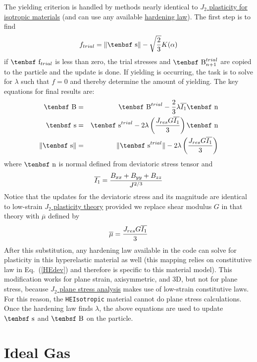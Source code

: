 \documentclass[11pt]{book}
\def\B{\hbox{\tenbsf B}}
\def\dev{\hbox{\tenbsf s}}
\def\ndev{\hbox{\tenbsf n}}
\def\f{\hbox{\tenbsf f}}
\def\Jres{J_{res}}
\begin{document}
The yielding criterion is handled by methods nearly identical to \hyperref[J2ISO]{$J_2$ plasticity for isotropic materials} (and can use any available \hyperref[HardLaws]{hardening law}).  The first step is to find
\begin{equation}
      f_{trial} =   \|\dev\| - \sqrt{2\over3} K(\alpha)
\end{equation}
if $\f_{trial}$ is less than zero, the trial stresses and $\B_{n+1}^{trial}$ are copied to the particle and the update is done. If yielding is occurring, the task is to solve for $\lambda$ such that $f=0$ and thereby determine the amount of yielding. The key equations for final results are:
\begin{eqnarray}
        \B & = & \B^{trial} - {2\over 3}\lambda \overline{I_1} \ndev \\
        \dev & = & \dev^{trial} - 2 \lambda \left({\Jres G\overline{I_1}\over 3}\right) \ndev \\
        \|\dev\| & = & \|\dev^{trial}\| - 2\lambda  \left({\Jres G\overline{I_1}\over 3}\right)
\end{eqnarray}
where $\ndev$ is normal defined from deviatoric stress tensor and
\begin{equation}
    \overline{I_1} = {B_{xx} + B_{yy} + B_{zz}\over J^{2/3}}
\end{equation}
Notice that the updates for the deviatoric stress and its magnitude are identical to low-strain \hyperref[J2ISO]{$J_2$ plasticity theory} provided we replace shear modulus $G$ in that theory with $\overline\mu$ defined by
\begin{equation}
    \overline\mu = {\Jres G\overline{I_1}\over 3}
\end{equation}
After this substitution, any hardening law available in the code can solve for plasticity in this hyperelastic material as well (this mapping relies on constitutive law in Eq.~(\ref{HEdev}) and therefore is specific to this material model). This modification works for plane strain, axisymmetric, and 3D, but not for plane stress, because \hyperref[J2PStress]{$J_2$ plane stress analysis} makes use of low-strain constitutive laws. For this reason, the {\tt HEIsotropic} material cannot do plane stress calculations. Once the hardening law finds $\lambda$, the above equations are used to update $\dev$ and $\B$ on the particle.

\section{Ideal Gas}
\end{document}
